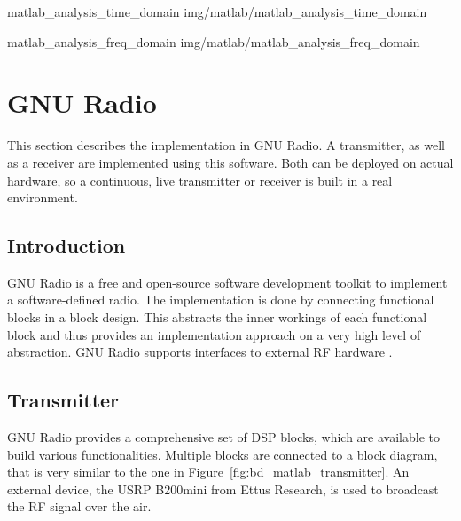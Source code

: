  {matlab_analysis_time_domain} {img/matlab/matlab_analysis_time_domain}

 {matlab_analysis_freq_domain} {img/matlab/matlab_analysis_freq_domain}

\section{GNU Radio}

This section describes the implementation in GNU Radio.
A transmitter, as well as a receiver are implemented using this software.
Both can be deployed on actual hardware, so a continuous, live transmitter or receiver is built in a real environment.

\subsection{Introduction}

GNU Radio is a free and open-source software development toolkit to implement a software-defined radio.
The implementation is done by connecting functional blocks in a block design.
This abstracts the inner workings of each functional block and thus provides an implementation approach on a very high level of abstraction.
GNU Radio supports interfaces to external RF hardware \cite{SoftwareGnuRadio}.

\subsection{Transmitter}

GNU Radio provides a comprehensive set of DSP blocks, which are available to build various functionalities.
Multiple blocks are connected to a block diagram, that is very similar to the one in Figure~\ref{fig:bd_matlab_transmitter}.
An external device, the USRP B200mini from Ettus Research, is used to broadcast the RF signal over the air.\\

